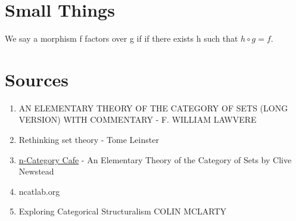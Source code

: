 \begin{appendix}

\section{Small Things}

\begin{remark}
We say a morphism f factors over g if if there exists h such that $h \circ g = f$.
\end{remark}

\section{Sources}

\begin{enumerate}
\item AN ELEMENTARY THEORY
OF THE CATEGORY OF SETS (LONG VERSION)
WITH COMMENTARY - F. WILLIAM LAWVERE
\item Rethinking set theory - Tome Leinster
\item \href{https://golem.ph.utexas.edu/category/2014/01/an_elementary_theory_of_the_ca.html}{n-Category Cafe} - An Elementary Theory of the Category of Sets by Clive Newstead
\item ncatlab.org
\item Exploring Categorical Structuralism
COLIN MCLARTY
\end{enumerate}

\end{appendix}


